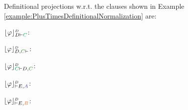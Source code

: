 \begin{example}
\label{example:DProjectionDefinitional}
Definitional projections w.r.t. the clauses shown in Example \ref{example:PlusTimesDefinitionalNormalization} are:

\begin{multicols}{3}{
$\projectionDefinitional{\varphi}{D \seq \hE{C}}$:
\begin{prooftree}
 
 
 
\end{prooftree}
\vfill\columnbreak


$\projectionDefinitional{\varphi}{D, \hF{C} \seq }$:
\begin{prooftree}
 
 
 
 
\end{prooftree}

$\projectionDefinitional{\varphi}{\hE{C} \seq D, \hF{C}}$:
\begin{prooftree}
		 
		 
	 
\end{prooftree}
}
\end{multicols}


\begin{multicols}{3}{
$\projectionDefinitional{\varphi}{\seq E, \hD{A}}$:
\begin{prooftree}
 
 
 
 
\end{prooftree}

$\projectionDefinitional{\varphi}{\seq E, \hC{B}}$:
\begin{prooftree}
 
 
 
 
\end{prooftree}

}
\end{multicols}
\end{example}
